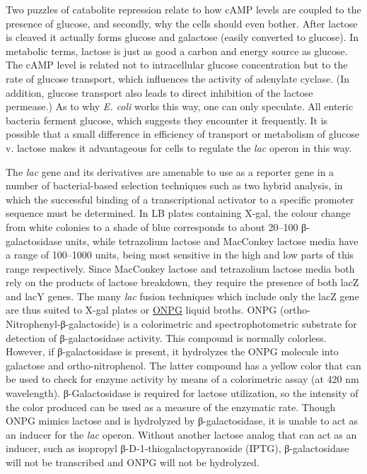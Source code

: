 Two puzzles of catabolite repression relate to how cAMP levels are coupled to the presence of glucose, and secondly, why the cells should even bother. After lactose is cleaved it actually forms glucose and galactose (easily converted to glucose). In metabolic terms, lactose is just as good a carbon and energy source as glucose. The cAMP level is related not to intracellular glucose concentration but to the rate of glucose transport, which influences the activity of adenylate cyclase. (In addition, glucose transport also leads to direct inhibition of the lactose permease.) As to why \emph{E. coli} works this way, one can only speculate. All enteric bacteria ferment glucose, which suggests they encounter it frequently. It is possible that a small difference in efficiency of transport or metabolism of glucose v. lactose makes it advantageous for cells to regulate the \emph{lac} operon in this way.

The \emph{lac} gene and its derivatives are amenable to use as a reporter gene in a number of bacterial-based selection techniques such as two hybrid analysis, in which the successful binding of a transcriptional activator to a specific promoter sequence must be determined. In LB plates containing X-gal, the colour change from white colonies to a shade of blue corresponds to about 20--100 β-galactosidase units, while tetrazolium lactose and MacConkey lactose media have a range of 100--1000 units, being most sensitive in the high and low parts of this range respectively. Since MacConkey lactose and tetrazolium lactose media both rely on the products of lactose breakdown, they require the presence of both lacZ and lacY genes. The many \emph{lac} fusion techniques which include only the lacZ gene are thus suited to X-gal plates or \href{https://en.wikipedia.org/wiki/Ortho-Nitrophenyl-\%CE\%B2-galactoside}{ONPG} liquid broths. ONPG (ortho-Nitrophenyl-β-galactoside) is a colorimetric and spectrophotometric substrate for detection of β-galactosidase activity. This compound is normally colorless. However, if β-galactosidase is present, it hydrolyzes the ONPG molecule into galactose and ortho-nitrophenol. The latter compound has a yellow color that can be used to check for enzyme activity by means of a colorimetric assay (at 420 nm wavelength). β-Galactosidase is required for lactose utilization, so the intensity of the color produced can be used as a measure of the enzymatic rate. Though ONPG mimics lactose and is hydrolyzed by β-galactosidase, it is unable to act as an inducer for the \emph{lac} operon. Without another lactose analog that can act as an inducer, such as isopropyl β-D-1-thiogalactopyranoside (IPTG), β-galactosidase will not be transcribed and ONPG will not be hydrolyzed.

